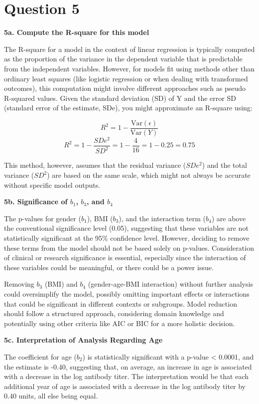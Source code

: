 \documentclass{article}
\begin{document}
\section{Question 5}

\textbf{5a. Compute the R-square for this model}

The R-square for a model in the context of linear regression is typically computed as the proportion of the variance in the dependent variable that is predictable from the independent variables. However, for models fit using methods other than ordinary least squares (like logistic regression or when dealing with transformed outcomes), this computation might involve different approaches such as pseudo R-squared values. Given the standard deviation (SD) of Y and the error SD (standard error of the estimate, SDe), you might approximate an R-square using:

\[
R^2 = 1 - \frac{\text{Var}(\epsilon)}{\text{Var}(Y)}
\]
\[
R^2 = 1 - \frac{SDe^2}{SD^2} = 1 - \frac{4}{16} = 1 - 0.25 = 0.75
\]

This method, however, assumes that the residual variance ($SDe^2$) and the total variance ($SD^2$) are based on the same scale, which might not always be accurate without specific model outputs.

\textbf{5b. Significance of \(b_1\), \(b_3\), and \(b_4\) }

The p-values for gender (\(b_1\)), BMI (\(b_3\)), and the interaction term (\(b_4\)) are above the conventional significance level (0.05), suggesting that these variables are not statistically significant at the 95\% confidence level. However, deciding to remove these terms from the model should not be based solely on p-values. Consideration of clinical or research significance is essential, especially since the interaction of these variables could be meaningful, or there could be a power issue. 

Removing \(b_3\) (BMI) and \(b_4\) (gender-age-BMI interaction) without further analysis could oversimplify the model, possibly omitting important effects or interactions that could be significant in different contexts or subgroups. Model reduction should follow a structured approach, considering domain knowledge and potentially using other criteria like AIC or BIC for a more holistic decision.

\textbf{5c. Interpretation of Analysis Regarding Age}

The coefficient for age (\(b_2\)) is statistically significant with a p-value < 0.0001, and the estimate is -0.40, suggesting that, on average, an increase in age is associated with a decrease in the log antibody titer. The interpretation would be that each additional year of age is associated with a decrease in the log antibody titer by 0.40 units, all else being equal.
\end{document}
